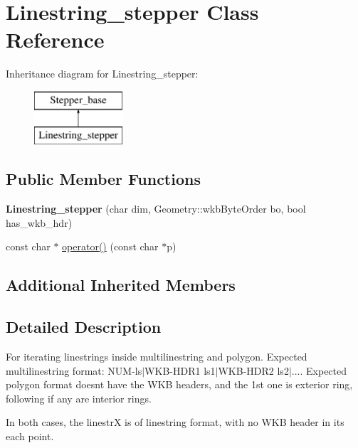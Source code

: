 \hypertarget{classLinestring__stepper}{}\section{Linestring\+\_\+stepper Class Reference}
\label{classLinestring__stepper}
Inheritance diagram for Linestring\+\_\+stepper\+:\begin{figure}[H]
\begin{center}
\leavevmode
\includegraphics[height=2.000000cm]{classLinestring__stepper}
\end{center}
\end{figure}
\subsection*{Public Member Functions}
\begin{DoxyCompactItemize}
\item 
\mbox{\label{classLinestring__stepper_a13e559afd01d5c7b690797a81f88041f}} 
{\bfseries Linestring\+\_\+stepper} (char dim, Geometry\+::wkb\+Byte\+Order bo, bool has\+\_\+wkb\+\_\+hdr)
\item 
const char $\ast$ \mbox{\hyperlink{classLinestring__stepper_ac9d6663371fe790dce1b5b2280c6e419}{operator()}} (const char $\ast$p)
\end{DoxyCompactItemize}
\subsection*{Additional Inherited Members}


\subsection{Detailed Description}
For iterating linestrings inside multilinestring and polygon. Expected multilinestring format\+: N\+UM-\/ls$\vert$\+W\+KB-\/H\+D\+R1 ls1$\vert$\+W\+KB-\/H\+D\+R2 ls2$\vert$.... Expected polygon format doesn\textquotesingle{}t have the W\+KB headers, and the 1st one is exterior ring, following if any are interior rings.

In both cases, the linestrX is of linestring format, with no W\+KB header in its each point. 


